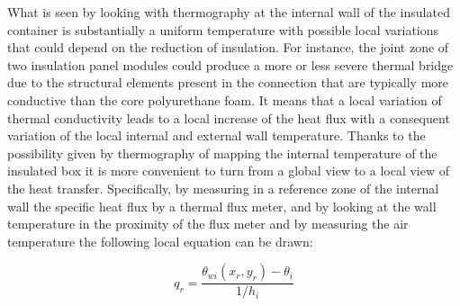 \documentclass{tQRT2e}
\begin{document}
What is seen by looking with thermography at the internal wall of the insulated container is substantially a uniform temperature with possible local variations that could depend on the reduction of insulation. For instance, the joint zone of two insulation panel modules could produce a more or less severe thermal bridge due to the structural elements present in the connection that are typically more conductive than the core polyurethane foam. It means that a local variation of thermal conductivity leads to a local increase of the heat flux with a consequent variation of the local internal and external wall temperature. Thanks to the possibility given by thermography of mapping the internal temperature of the insulated box it is more convenient to turn from a global view to a local view of the heat transfer. Specifically, by measuring in a reference zone of the internal wall the specific heat flux by a thermal flux meter, and by looking at the wall temperature in the proximity of the flux meter and by measuring the air temperature the following local equation can be drawn:

\begin{equation}
q_r=\frac{\theta_{wi}(x_r,y_r )-\theta_i}{1/h_i}
\end{equation}
\end{document}
